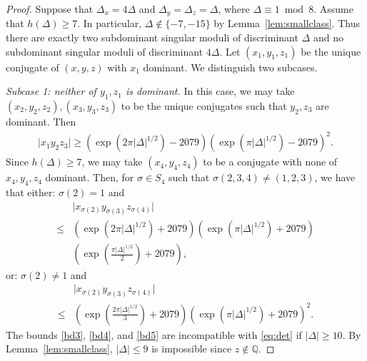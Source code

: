 \documentclass[10pt,a4paper]{amsart}
\newcommand{\Q}{\mathbb{Q}} %
\begin{document}
\begin{proof}
Suppose that $\Delta_x = 4 \Delta$ and $\Delta_y = \Delta_z = \Delta$, where $\Delta \equiv 1 \bmod 8$. Assume that $h(\Delta) \geq 7$. In particular, $\Delta \notin \{-7, -15\}$ by Lemma~\ref{lem:smallclass}. Thus there are exactly two subdominant singular moduli of discriminant $\Delta$ and no subdominant singular moduli of discriminant $4 \Delta$. Let $(x_1, y_1, z_1)$ be the unique conjugate of $(x, y, z)$ with $x_1$ dominant. We distinguish two subcases.

\textit{Subcase 1: neither of $y_1, z_1$ is dominant.} In this case, we may take $(x_2, y_2, z_2), (x_3, y_3, z_3)$ to be the unique conjugates such that $y_2, z_3$ are dominant. Then
\begin{align}\label{bd3}
	\lvert x_1 y_2 z_3 \rvert \geq (\exp(2 \pi \lvert \Delta \rvert^{1/2}) - 2079)(\exp(\pi \lvert \Delta \rvert^{1/2}) - 2079)^2.
\end{align}
Since $h(\Delta) \geq 7$, we may take $(x_4, y_4, z_4)$ to be a conjugate with none of $x_4, y_4, z_4$ dominant. Then, for $\sigma \in S_4$ such that $\sigma(2, 3, 4) \neq (1, 2, 3)$, we have that either: $\sigma(2)=1$ and
\begin{align}\label{bd4}
	&\lvert x_{\sigma(2)} y_{\sigma(3)} z_{\sigma(4)} \rvert \nonumber \\ 
	\leq &(\exp(2 \pi \lvert \Delta \rvert^{1/2}) + 2079)(\exp(\pi \lvert \Delta \rvert^{1/2}) + 2079)\nonumber \\ 
	&\left(\exp\left(\frac{\pi \lvert \Delta \rvert^{1/2}}{2}\right) + 2079\right),
\end{align}
or: $\sigma(2) \neq 1$ and
\begin{align}\label{bd5}
	&\lvert x_{\sigma(2)} y_{\sigma(3)} z_{\sigma(4)} \rvert \nonumber \\
	\leq &\left(\exp\left(\frac{2 \pi \lvert \Delta \rvert^{1/2}}{3}\right) + 2079\right)(\exp(\pi \lvert \Delta \rvert^{1/2}) + 2079)^2.
\end{align}
The bounds \eqref{bd3}, \eqref{bd4}, and \eqref{bd5} are incompatible with \eqref{eq:det} if $\lvert \Delta \rvert \geq 10$. By Lemma~\ref{lem:smallclass}, $\lvert \Delta \rvert \leq 9$ is impossible since $z \notin \Q$.


\end{proof}
\end{document}
